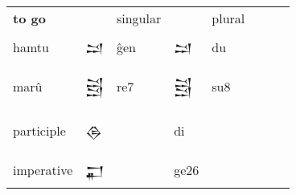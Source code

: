 \documentclass[a4paper,12pt]{book}
\newcommand{\fcm}{\large\setmainfont{Akkadian.otf}}
\begin{document}
\verb||\\
\begin{tabular}[!h]{l | l l | l l l l l}
\bf to go && singular && plural \\
  hamtu & {\fcm 𒁺}     & ĝen & {\fcm 𒁺}     & du \\
&&&&\\
  marû & {\fcm 𒁻}    & re7 & {\fcm 𒁻}     & su8 \\
  &&&&\\
  \hline
 &\multicolumn{2}{l}{ } & \\
  participle &\multicolumn{2}{l}{{\fcm 𒁲} } & di\\
 &\multicolumn{2}{l}{ } & \\
  imperative &\multicolumn{2}{l}{{\fcm 𒂷}} & ge26\\
\end{tabular}\verb||\\


\printindex
\end{document}
